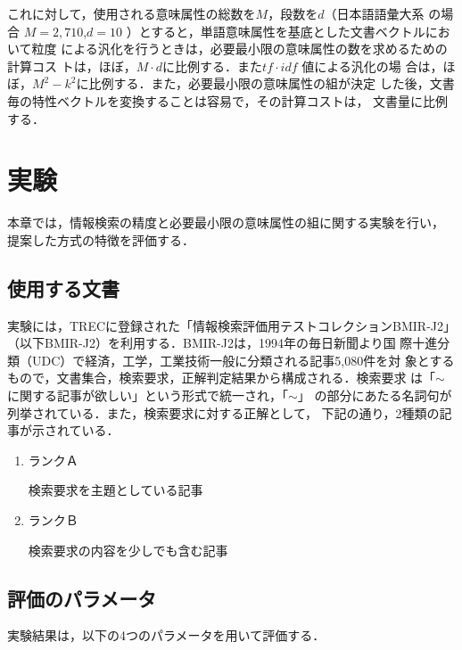 これに対して，使用される意味属性の総数を$M$，段数を$d$（日本語語彙大系
の場合 $M=2,710$,$d=10$ ）とすると，単語意味属性を基底とした文書ベクトルにおいて粒度
による汎化を行うときは，必要最小限の意味属性の数を求めるための計算コス
トは，ほぼ，$M \cdot d$に比例する．また$tf \cdot idf$ 値による汎化の場
合は，ほぼ，$M^2-k^2$に比例する．また，必要最小限の意味属性の組が決定
した後，文書毎の特性ベクトルを変換することは容易で，その計算コストは，
文書量に比例する．

\section{実験}
\label{experiment}

本章では，情報検索の精度と必要最小限の意味属性の組に関する実験を行い，
提案した方式の特徴を評価する．

\subsection{使用する文書}

実験には，TRECに登録された「情報検索評価用テストコレクションBMIR-J2」
\cite{木谷}（以下BMIR-J2）を利用する．BMIR-J2は，1994年の毎日新聞より国
際十進分類（UDC）で経済，工学，工業技術一般に分類される記事5,080件を対
象とするもので，文書集合，検索要求，正解判定結果から構成される．検索要求
は「$ \sim $ に関する記事が欲しい」という形式で統一され，「$ \sim $」
の部分にあたる名詞句が列挙されている．また，検索要求に対する正解として，
下記の通り，2種類の記事が示されている．

\begin{enumerate}

\item ランクＡ

検索要求を主題としている記事

\item ランクＢ

検索要求の内容を少しでも含む記事

\end{enumerate}

\subsection{評価のパラメータ}

実験結果は，以下の4つのパラメータを用いて評価する．

